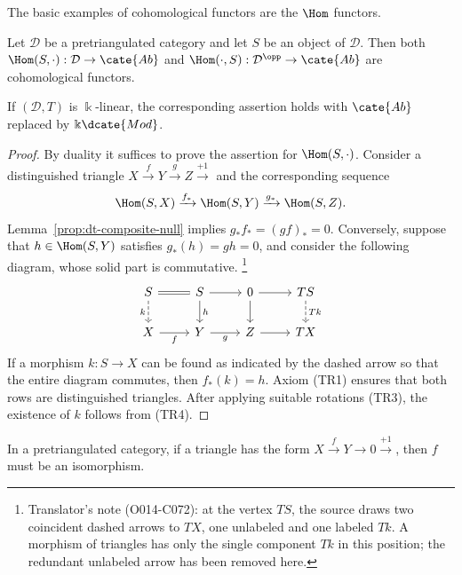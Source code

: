 The basic examples of cohomological functors are the $\Hom$ functors.

\begin{proposition}\label{prop:cohomological-Hom-functor}
	Let $\mathcal{D}$ be a pretriangulated category and let $S$ be an object
	of $\mathcal{D}$. Then both
	$\Hom(S, \cdot): \mathcal{D} \to \cate{Ab}$ and
	$\Hom(\cdot, S): \mathcal{D}^{\opp} \to \cate{Ab}$ are cohomological
	functors.

	If $(\mathcal{D}, T)$ is $\Bbbk$-linear, the corresponding assertion
	holds with $\cate{Ab}$ replaced by $\Bbbk\dcate{Mod}$.
\end{proposition}

\begin{proof}
	By duality it suffices to prove the assertion for $\Hom(S, \cdot)$.
	Consider a distinguished triangle
	$X \xrightarrow{f} Y \xrightarrow{g} Z \xrightarrow{+1}$ and the
	corresponding sequence
	\[ \Hom(S, X) \xrightarrow{f_*} \Hom(S, Y) \xrightarrow{g_*} \Hom(S, Z). \]
	Lemma~\ref{prop:dt-composite-null} implies
	$g_* f_* = (gf)_* = 0$. Conversely, suppose that
	$h \in \Hom(S, Y)$ satisfies $g_*(h) = gh = 0$, and consider the
	following diagram, whose solid part is commutative.%
	\footnote{Translator's note (O014-C072): at the vertex $TS$, the source
	draws two coincident dashed arrows to $TX$, one unlabeled and one labeled
	$Tk$. A morphism of triangles has only the single component $Tk$ in this
	position; the redundant unlabeled arrow has been removed here.}
	\[\begin{tikzcd}
		S \arrow[dashed, d, "k"'] \arrow[equal, r] & S \arrow[d, "h"] \arrow[r] & 0 \arrow[d] \arrow[r] & TS \arrow[dashed, d, "Tk"] \\
		X \arrow[r, "f"'] & Y \arrow[r, "g"'] & Z \arrow[r] & TX
	\end{tikzcd}\]
	If a morphism $k: S \to X$ can be found as indicated by the dashed arrow
	so that the entire diagram commutes, then $f_*(k) = h$. Axiom (TR1)
	ensures that both rows are distinguished triangles. After applying
	suitable rotations (TR3), the existence of $k$ follows from (TR4).
\end{proof}

\begin{corollary}\label{prop:triangle-0-isom}
	In a pretriangulated category, if a triangle has the form
	$X \xrightarrow{f} Y \to 0 \xrightarrow{+1}$, then $f$ must be an
	isomorphism.
\end{corollary}

